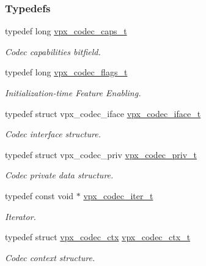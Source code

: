 \subsubsection*{Typedefs}
\begin{DoxyCompactItemize}
\item 
typedef long \hyperlink{group__codec_gad2b690c0ef83cbd83a7234078791913f}{vpx\-\_\-codec\-\_\-caps\-\_\-t}
\begin{DoxyCompactList}\small\item\em Codec capabilities bitfield. \end{DoxyCompactList}\item 
typedef long \hyperlink{group__codec_ga3b36d5af89ddc463489fe5bde0a57877}{vpx\-\_\-codec\-\_\-flags\-\_\-t}
\begin{DoxyCompactList}\small\item\em Initialization-\/time Feature Enabling. \end{DoxyCompactList}\item 
typedef struct vpx\-\_\-codec\-\_\-iface \hyperlink{group__codec_gad654f3da60151f5dfef70aca00ef1e9e}{vpx\-\_\-codec\-\_\-iface\-\_\-t}
\begin{DoxyCompactList}\small\item\em Codec interface structure. \end{DoxyCompactList}\item 
typedef struct vpx\-\_\-codec\-\_\-priv \hyperlink{group__codec_ga1e262f91be9141a7176335fd409397ab}{vpx\-\_\-codec\-\_\-priv\-\_\-t}
\begin{DoxyCompactList}\small\item\em Codec private data structure. \end{DoxyCompactList}\item 
typedef const void $\ast$ \hyperlink{group__codec_ga6ea348f76b1f8a1fe50e14db684146c6}{vpx\-\_\-codec\-\_\-iter\-\_\-t}
\begin{DoxyCompactList}\small\item\em Iterator. \end{DoxyCompactList}\item 
typedef struct \hyperlink{structvpx__codec__ctx}{vpx\-\_\-codec\-\_\-ctx} \hyperlink{group__codec_gad03e2dfa6ae511db7d25be6bbb336233}{vpx\-\_\-codec\-\_\-ctx\-\_\-t}
\begin{DoxyCompactList}\small\item\em Codec context structure. \end{DoxyCompactList}\end{DoxyCompactItemize}
